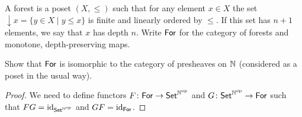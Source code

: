\begin{exercise}{8.3}
    A forest is a poset $(X,\leq)$ such that for any element $x\in X$ the set $\downarrow x=\{y\in X\mid y\leq x\}$ is finite and linearly ordered by $\leq$.
    If this set has $n+1$ elements, we say that $x$ has depth $n$. Write $\normalfont\mathsf{For}$ for the category of forests and monotone, depth-preserving maps.

    Show that $\normalfont\mathsf{For}$ is isomorphic to the category of presheaves on $\mathbb{N}$ (considered as a poset in the usual way).
\end{exercise}
\begin{solution}
    \begin{proof}
        We need to define functors $F\colon\normalfont\mathsf{For}\to{\normalfont\mathsf{Set}}^{{\mathbb{N}}^{\text{op}}}$ and $G\colon{\normalfont\mathsf{Set}}^{{\mathbb{N}}^{\text{op}}}\to\normalfont\mathsf{For}$ such that $FG=\operatorname{id}_{{\normalfont\mathsf{Set}}^{{\mathbb{N}}^{\text{op}}}}$ and $GF=\operatorname{id}_{\normalfont\mathsf{For}}$.
    \end{proof}
\end{solution}
